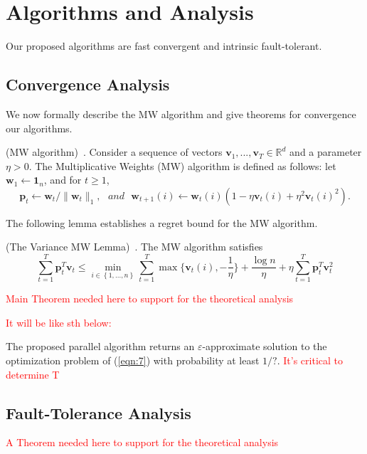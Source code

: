 \documentclass{llncs}
\newcommand{\bw}{\mathbf{w}}
\newcommand{\bp}{\mathbf{p}}
\newcommand{\sumt}{\sum_{t=1}^{T} }
\newcommand{\lc}{\left(}
\newcommand{\rc}{\right)}
\newcommand{\comment}{\textcolor{red}}
\begin{document}
\section{Algorithms and Analysis} \label{sec:alg}

Our proposed algorithms are fast convergent and intrinsic fault-tolerant.
	
\subsection{Convergence Analysis}
	We now formally describe the MW algorithm and give theorems for convergence our algorithms.

	\begin{definition}
	(MW algorithm)~\cite{clarkson2010sublinear}. Consider a sequence of vectors $\mathbf{v}_1,...,\mathbf{v}_T\in\mathbb{R}^d$ and a parameter $\eta>0$. The Multiplicative Weights (MW) algorithm is defined as follows: let $\bw_1 \leftarrow \mathbf{1}_n$, and for $t\geq 1$,
	\[
	\bp_t \leftarrow \bw_t/\|\bw_t\|_1, \,\,\,\, and \,\,\,\, \bw_{t+1}(i) \leftarrow \bw_t(i)\lc 1-\eta\mathbf{v}_t(i)+\eta^2\mathbf{v}_t(i)^2 \rc.
	\]
	\end{definition}
	
	The following lemma establishes a regret bound for the MW algorithm.
	
	\begin{lemma} \label{lem:2}
	(The Variance MW Lemma)~\cite{clarkson2010sublinear}. The MW algorithm satisfies
	\[
	\sumt \bp_t^T\mathbf{v}_t \leq \min_{i\in\left\{1,...,n\right\} } \sumt \max\{\mathbf{v}_t(i),-\frac{1}{\eta}\}+\frac{\log n}{\eta}+\eta\sumt\bp_t^T \mathbf{v}_t^2
	\]
	\end{lemma}
	
    \comment{Main Theorem needed here to support for the theoretical analysis}

    \comment{It will be like sth below:}
	
	\begin{theorem}
	The proposed parallel algorithm returns an $\varepsilon$-approximate solution to the optimization problem of (\ref{eqn:7}) with probability at least $1/?$. \comment{It's critical to determine T}
	\end{theorem}

\subsection{Fault-Tolerance Analysis}
    \comment{A Theorem needed here to support for the theoretical analysis}
\end{document}

